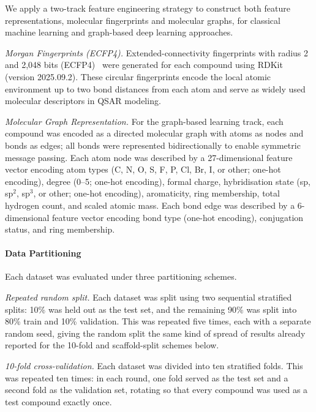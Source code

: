 \documentclass[letterpaper]{article}
\begin{document}
We apply a two-track feature engineering strategy to construct both feature representations, molecular fingerprints and molecular graphs, for classical machine learning and graph-based deep learning approaches.

{\noindent \em Morgan Fingerprints (ECFP4).}
Extended-connectivity fingerprints with radius 2 and 2,048 bits (ECFP4)~\cite{rogers2010extended} were generated for each compound using RDKit (version 2025.09.2). These circular fingerprints encode the local atomic environment up to two bond distances from each atom and serve as widely used molecular descriptors in QSAR modeling.

{\noindent \em Molecular Graph Representation.}
For the graph-based learning track, each compound was encoded as a directed molecular graph with atoms as nodes and bonds as edges; all bonds were represented bidirectionally to enable symmetric message passing. Each atom node was described by a 27-dimensional feature vector encoding atom types (C, N, O, S, F, P, Cl, Br, I, or other; one-hot encoding), degree (0--5; one-hot encoding), formal charge, hybridisation state (sp, sp$^2$, sp$^3$, or other; one-hot encoding), aromaticity, ring membership, total hydrogen count, and scaled atomic mass. Each bond edge was described by a 6-dimensional feature vector encoding bond type (one-hot encoding), conjugation status, and ring membership.

\paragraph{Data Partitioning}

Each dataset was evaluated under three partitioning schemes.

\emph{Repeated random split.} Each dataset was split using two sequential
stratified splits: 10\% was held out as the test set, and the remaining 90\%
was split into 80\% train and 10\% validation. This was repeated five times,
each with a separate random seed, giving the random split the same kind of
spread of results already reported for the 10-fold and scaffold-split
schemes below.

\emph{10-fold cross-validation.} Each dataset was divided into ten stratified
folds. This was repeated ten times: in each round, one fold served as the
test set and a second fold as the validation set, rotating so that every
compound was used as a test compound exactly once.
\end{document}
